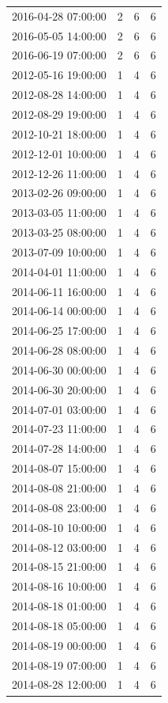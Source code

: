 \begin{tabular}{lrrr}
2016-04-28 07:00:00 & 2 & 6 & 6 \\
2016-05-05 14:00:00 & 2 & 6 & 6 \\
2016-06-19 07:00:00 & 2 & 6 & 6 \\
2012-05-16 19:00:00 & 1 & 4 & 6 \\
2012-08-28 14:00:00 & 1 & 4 & 6 \\
2012-08-29 19:00:00 & 1 & 4 & 6 \\
2012-10-21 18:00:00 & 1 & 4 & 6 \\
2012-12-01 10:00:00 & 1 & 4 & 6 \\
2012-12-26 11:00:00 & 1 & 4 & 6 \\
2013-02-26 09:00:00 & 1 & 4 & 6 \\
2013-03-05 11:00:00 & 1 & 4 & 6 \\
2013-03-25 08:00:00 & 1 & 4 & 6 \\
2013-07-09 10:00:00 & 1 & 4 & 6 \\
2014-04-01 11:00:00 & 1 & 4 & 6 \\
2014-06-11 16:00:00 & 1 & 4 & 6 \\
2014-06-14 00:00:00 & 1 & 4 & 6 \\
2014-06-25 17:00:00 & 1 & 4 & 6 \\
2014-06-28 08:00:00 & 1 & 4 & 6 \\
2014-06-30 00:00:00 & 1 & 4 & 6 \\
2014-06-30 20:00:00 & 1 & 4 & 6 \\
2014-07-01 03:00:00 & 1 & 4 & 6 \\
2014-07-23 11:00:00 & 1 & 4 & 6 \\
2014-07-28 14:00:00 & 1 & 4 & 6 \\
2014-08-07 15:00:00 & 1 & 4 & 6 \\
2014-08-08 21:00:00 & 1 & 4 & 6 \\
2014-08-08 23:00:00 & 1 & 4 & 6 \\
2014-08-10 10:00:00 & 1 & 4 & 6 \\
2014-08-12 03:00:00 & 1 & 4 & 6 \\
2014-08-15 21:00:00 & 1 & 4 & 6 \\
2014-08-16 10:00:00 & 1 & 4 & 6 \\
2014-08-18 01:00:00 & 1 & 4 & 6 \\
2014-08-18 05:00:00 & 1 & 4 & 6 \\
2014-08-19 00:00:00 & 1 & 4 & 6 \\
2014-08-19 07:00:00 & 1 & 4 & 6 \\
2014-08-28 12:00:00 & 1 & 4 & 6 \\

\end{tabular}
